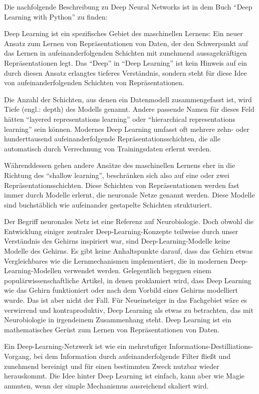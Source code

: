 Die nachfolgende Beschreibung zu Deep Neural Networks ist in dem Buch ``Deep Learning with Python'' \cite{chollet2021deep} zu finden:

Deep Learning ist ein spezifisches Gebiet des maschinellen Lernens: Ein neuer Ansatz zum Lernen von Repräsentationen von Daten, der den Schwerpunkt auf das Lernen in aufeinanderfolgenden Schichten mit zunehmend aussagekräftigen Repräsentationen legt. Das ``Deep'' in ``Deep Learning'' ist kein Hinweis auf ein durch diesen Ansatz erlangtes tieferes Verständnis, sondern steht für diese Idee von aufeinanderfolgenden Schichten von Repräsentationen.

Die Anzahl der Schichten, aus denen ein Datenmodell zusammengefasst ist, wird Tiefe (engl.: depth) des Modells genannt. Andere passende Namen für dieses Feld hätten ``layered representations learning'' oder ``hierarchical representations learning'' sein können. Modernes Deep Learning umfasst oft mehrere zehn- oder hunderttausend aufeinanderfolgende Repräsentationsschichten, die alle automatisch durch Verrechnung von Trainingsdaten erlernt werden.

Währenddessen gehen andere Ansätze des maschinellen Lernens eher in die Richtung des ``shallow learning'', beschränken sich also auf eine oder zwei Repräsentationsschichten. Diese Schichten von Repräsentationen werden fast immer durch Modelle erlernt, die neuronale Netze genannt werden. Diese Modelle sind buchstäblich wie aufeinander gestapelte Schichten strukturiert.

Der Begriff neuronales Netz ist eine Referenz auf Neurobiologie. Doch obwohl die Entwicklung einiger zentraler Deep-Learning-Konzepte teilweise durch unser Verständnis des Gehirns inspiriert war, sind Deep-Learning-Modelle keine Modelle des Gehirns. Es gibt keine Anhaltspunkte darauf, dass das Gehirn etwas Vergleichbares wie die Lernmechanismen implementiert, die in modernen Deep-Learning-Modellen verwendet werden. Gelegentlich begegnen einem populärwissenschaftliche Artikel, in denen proklamiert wird, dass Deep Learning wie das Gehirn funktioniert oder nach dem Vorbild eines Gehirns modelliert wurde. Das ist aber nicht der Fall. Für Neueinsteiger in das Fachgebiet wäre es verwirrend und kontraproduktiv, Deep Learning als etwas zu betrachten, das mit Neurobiologie in irgendeinem Zusammenhang steht. Deep Learning ist ein mathematisches Gerüst zum Lernen von Repräsentationen von Daten.

Ein Deep-Learning-Netzwerk ist wie ein mehrstufiger Informations-Destilliations-Vorgang, bei dem Information durch aufeinanderfolgende Filter fließt und zunehmend bereinigt und für einen bestimmten Zweck nutzbar wieder herauskommt. Die Idee hinter Deep Learning ist einfach, kann aber wie Magie anmuten, wenn der simple Mechanismus ausreichend skaliert wird.
\cite{chollet2021deep}

